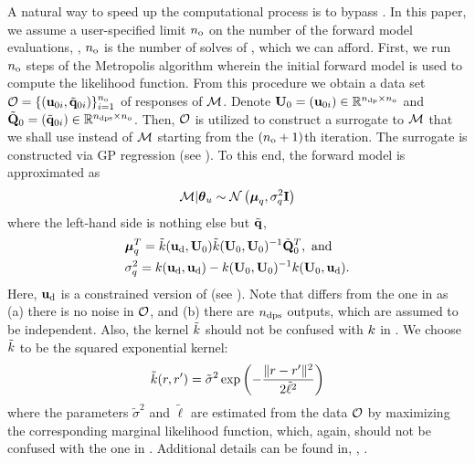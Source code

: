 A natural way to speed up the computational process is to bypass . In this paper, we assume a user-specified limit ${n_\text{o}}$ on the number of the forward model evaluations, \ie, ${n_\text{o}}$ is the number of solves of , which we can afford. First, we run ${n_\text{o}}$ steps of the Metropolis algorithm wherein the initial forward model is used to compute the likelihood function. From this procedure we obtain a data set $\mathcal{O} = \{ (\mathbf{u}_{0i}, \tilde{\mathbf{q}}_{0i}) \}_{i = 1}^{n_\text{o}}$ of responses of $\model$. Denote $\mathbf{U}_0 = (\mathbf{u}_{0i}) \in \mathbb{R}^{{n_\text{dp}} \times {n_\text{o}}}$ and $\tilde{\mathbf{Q}}_0 = (\tilde{\mathbf{q}}_{0i}) \in \mathbb{R}^{{n_\text{dps}} \times {n_\text{o}}}$. Then, $\mathcal{O}$ is utilized to construct a surrogate to $\model$ that we shall use instead of $\model$ starting from the $({n_\text{o}} + 1)$th iteration. The surrogate is constructed via GP regression (see ). To this end, the forward model is approximated as
\begin{equation} \elabel{gp-approximation}
  \model | \vparam_\u \sim \gaussian{\vmean_\T}{\sigma^2_\T \mI}
\end{equation}
where the left-hand side is nothing else but $\tilde{\mathbf{q}}$,
\begin{align}
  & \vmean_\T^T = \tilde{\fCov}(\vu_\data, \mU_0) \tilde{\fCov}(\mU_0, \mU_0)^{-1} \mmT_0^T, \text{ and} \elabel{gp-mean} \\
  & \sigma^2_\T = \fCov{\vu_\data, \vu_\data} - \fCov{\mU_0, \mU_0}^{-1} \fCov{\mU_0, \vu_\data}. \elabel{gp-variance}
\end{align}
Here, $\mathbf{u}_{\text{d}}$ is a constrained version of  (see ). Note that  differs from the one in  as (a) there is no noise in $\mathcal{O}$, and (b) there are ${n_\text{dps}}$ outputs, which are assumed to be independent. Also, the kernel $\tilde{\fCov}$ should not be confused with $\fCov$ in . We choose $\tilde{\fCov}$ to be the squared exponential kernel:
\[
  \tilde{\fCov}(\r, \r') = \tilde{\sigma}^2 \exp\left(-\frac{\norm{\r - \r'}^2}{2 \tilde{\ell}^2}\right)
\]
where the parameters $\tilde{\sigma}^2$ and $\tilde{\ell}$ are estimated from the data $\mathcal{O}$ by maximizing the corresponding marginal likelihood function, which, again, should not be confused with the one in . Additional details can be found in, \eg, \cite{mackay2003, rasmussen2006}.

